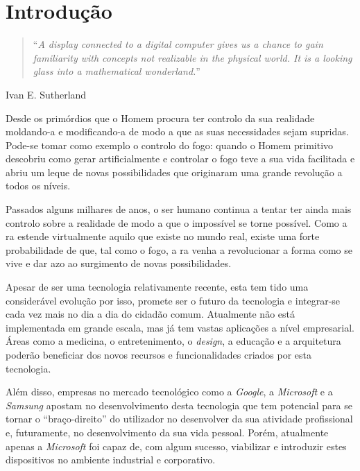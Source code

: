 \documentclass{report}
\begin{document}
\tableofcontents
\listoffigures

\clearpage
{}

\chapter{Introdução}
\label{chap.introducao}


\begin{quote}
    ``\emph{A display connected to a digital computer gives us a chance to gain familiarity with concepts not realizable in the physical world. It is a looking glass into a mathematical wonderland.}''\cite{Sutherland65theultimate}
\end{quote}
\begin{flushright}
Ivan E. Sutherland
\end{flushright}

Desde os primórdios que o Homem procura ter controlo da sua realidade moldando-a e modificando-a de modo a que as suas necessidades sejam supridas. Pode-se tomar como exemplo o controlo do fogo: quando o Homem primitivo descobriu como gerar artificialmente e controlar o fogo teve a sua vida facilitada e abriu um leque de novas possibilidades que originaram uma grande revolução a todos os níveis.

Passados alguns milhares de anos, o ser humano continua a tentar ter ainda mais controlo sobre a realidade de modo a que o impossível se torne possível. Como a \ac{ra} estende virtualmente aquilo que existe no mundo real, existe uma forte probabilidade de que, tal como o fogo, a \ac{ra} venha a revolucionar a forma como se vive e dar azo ao surgimento de novas possibilidades.

Apesar de ser uma tecnologia relativamente recente, esta tem tido uma considerável evolução por isso, promete ser o futuro da tecnologia e integrar-se cada vez mais no dia a dia do cidadão comum. Atualmente não está implementada em grande escala, mas já tem vastas aplicações a nível empresarial. Áreas como a medicina, o entretenimento, o \textit{design}, a educação e a arquitetura poderão beneficiar dos novos recursos e funcionalidades criados por esta tecnologia.

Além disso, empresas no mercado tecnológico como a \textit{Google}, a \textit{Microsoft} e a \textit{Samsung} apostam no desenvolvimento desta tecnologia que tem potencial para se tornar o “braço-direito” do utilizador no desenvolver da sua atividade profissional e, futuramente, no desenvolvimento da sua vida pessoal. Porém, atualmente apenas a \textit{Microsoft} foi capaz de, com algum sucesso, viabilizar e introduzir estes dispositivos no ambiente industrial e corporativo.
\end{document}
